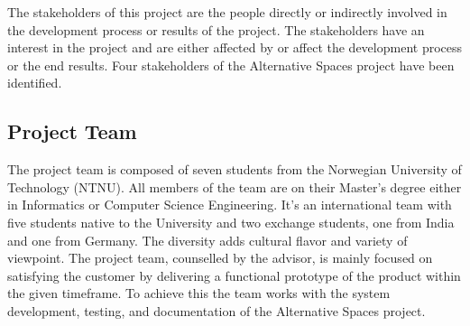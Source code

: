The stakeholders of this project are the people directly or indirectly involved in the development process or results of the project. The stakeholders have an interest in the project and are either affected by or affect the development process or the end results. Four stakeholders of the Alternative Spaces project have been identified.

\subsection{Project Team}
\label{subsec:IntroStakeProjectTeam}

The project team is composed of seven students from the Norwegian University of Technology (NTNU). All members of the team are on their Master's degree either in Informatics or Computer Science Engineering. It's an international team with five students native to the University and two exchange students, one from India and one from Germany. The diversity adds cultural flavor and variety of viewpoint. The project team, counselled by the advisor, is mainly focused on satisfying the customer by delivering a functional prototype of the product within the given timeframe. To achieve this the team works with the system development, testing, and documentation of the Alternative Spaces project. \\
%
